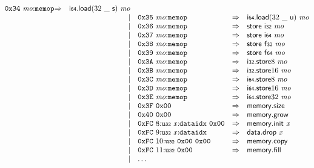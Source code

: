 $$\begin{array}{@{}l@{}rrlll@{}l@{}}
\mathtt{0x34}~{\mathit{mo}}{:}{\mathtt{memop}} &\Rightarrow& {\mathsf{i{\scriptstyle64}}.\mathsf{load}}{(32~\mathsf{\_}~\mathsf{s})}~{\mathit{mo}} \\ &&|&
\mathtt{0x35}~{\mathit{mo}}{:}{\mathtt{memop}} &\Rightarrow& {\mathsf{i{\scriptstyle64}}.\mathsf{load}}{(32~\mathsf{\_}~\mathsf{u})}~{\mathit{mo}} \\ &&|&
\mathtt{0x36}~{\mathit{mo}}{:}{\mathtt{memop}} &\Rightarrow& \mathsf{store}~\mathsf{i{\scriptstyle32}}~{\mathit{mo}} \\ &&|&
\mathtt{0x37}~{\mathit{mo}}{:}{\mathtt{memop}} &\Rightarrow& \mathsf{store}~\mathsf{i{\scriptstyle64}}~{\mathit{mo}} \\ &&|&
\mathtt{0x38}~{\mathit{mo}}{:}{\mathtt{memop}} &\Rightarrow& \mathsf{store}~\mathsf{f{\scriptstyle32}}~{\mathit{mo}} \\ &&|&
\mathtt{0x39}~{\mathit{mo}}{:}{\mathtt{memop}} &\Rightarrow& \mathsf{store}~\mathsf{f{\scriptstyle64}}~{\mathit{mo}} \\ &&|&
\mathtt{0x3A}~{\mathit{mo}}{:}{\mathtt{memop}} &\Rightarrow& {\mathsf{i{\scriptstyle32}}.\mathsf{store}}{8}~{\mathit{mo}} \\ &&|&
\mathtt{0x3B}~{\mathit{mo}}{:}{\mathtt{memop}} &\Rightarrow& {\mathsf{i{\scriptstyle32}}.\mathsf{store}}{16}~{\mathit{mo}} \\ &&|&
\mathtt{0x3C}~{\mathit{mo}}{:}{\mathtt{memop}} &\Rightarrow& {\mathsf{i{\scriptstyle64}}.\mathsf{store}}{8}~{\mathit{mo}} \\ &&|&
\mathtt{0x3D}~{\mathit{mo}}{:}{\mathtt{memop}} &\Rightarrow& {\mathsf{i{\scriptstyle64}}.\mathsf{store}}{16}~{\mathit{mo}} \\ &&|&
\mathtt{0x3E}~{\mathit{mo}}{:}{\mathtt{memop}} &\Rightarrow& {\mathsf{i{\scriptstyle64}}.\mathsf{store}}{32}~{\mathit{mo}} \\ &&|&
\mathtt{0x3F}~\mathtt{0x00} &\Rightarrow& \mathsf{memory.size} \\ &&|&
\mathtt{0x40}~\mathtt{0x00} &\Rightarrow& \mathsf{memory.grow} \\ &&|&
\mathtt{0xFC}~8{:}{\mathtt{u{\scriptstyle32}}}~{\mathit{x}}{:}{\mathtt{dataidx}}~\mathtt{0x00} &\Rightarrow& \mathsf{memory.init}~{\mathit{x}} \\ &&|&
\mathtt{0xFC}~9{:}{\mathtt{u{\scriptstyle32}}}~{\mathit{x}}{:}{\mathtt{dataidx}} &\Rightarrow& \mathsf{data.drop}~{\mathit{x}} \\ &&|&
\mathtt{0xFC}~10{:}{\mathtt{u{\scriptstyle32}}}~\mathtt{0x00}~\mathtt{0x00} &\Rightarrow& \mathsf{memory.copy} \\ &&|&
\mathtt{0xFC}~11{:}{\mathtt{u{\scriptstyle32}}}~\mathtt{0x00} &\Rightarrow& \mathsf{memory.fill} \\ &&|&
\dots \\
\end{array}
$$

